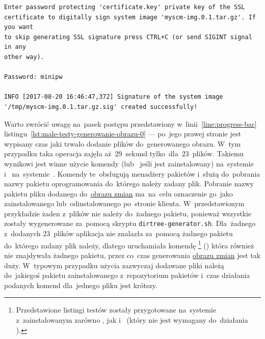 \documentclass[thesis]{subfiles}
\begin{document}
\begin{minipage}{\linewidth}
\begin{lstlisting}
Enter password protecting 'certificate.key' private key of the SSL
certificate to digitally sign system image 'myscm-img.0.1.tar.gz'. If you want
to skip generating SSL signature press CTRL+C (or send SIGINT signal in any
other way).

Password: minipw

INFO [2017-08-20 16:46:47,372] Signature of the system image '/tmp/myscm-img.0.1.tar.gz.sig' created successfully!
\end{lstlisting}
\end{minipage}

Warto zwrócić uwagę na~pasek postępu przedstawiony w~linii~\ref{line:progress-bar} listingu~\ref{lst:male-testy-generowanie-obrazu-0} --- po~jego prawej stronie jest wypisany czas jaki trwało dodanie plików do~generowanego obrazu. W~tym przypadku taka operacja zajęła aż~29~sekund tylko~dla~23~plików. Takiemu wynikowi jest winne użycie komendy  (lub~ jeśli jest zainstalowany) na~systemie \debian{} i~ na~systemie~\linuxarch{}. Komendy te~obsługują menadżery pakietów i~służą do~pobrania nazwy pakietu oprogramowania do~którego należy zadany plik. Pobranie nazwy pakietu pliku dodanego do~\hyperref[sec:obraz-zmian-konfiguracji]{obrazu zmian} ma~na~celu oznaczenie go~jako zainstalowanego lub~odinstalowanego po~stronie klienta. W~przedstawionym przykładzie żaden z~plików nie należy do~żadnego pakietu, ponieważ wszystkie zostały wygenerowane za~pomocą skryptu \texttt{dirtree-generator.sh}. Dla~żadnego z~dodanych 23~plików aplikacja nie znalazła za~pomocą  żadnego pakietu do~którego zadany plik należy, dlatego uruchamiała komendę \footnote{Przedstawione listingi testów zostały przygotowane na~systemie \debian{} z~zainstalowanym zarówno , jak i~ (który nie jest wymagany do~działania \texttt{\srvappname{}}).} () która również nie znajdywała żadnego pakietu, przez co~czas generowania \hyperref[sec:obraz-zmian-konfiguracji]{obrazu zmian} jest tak duży. W~typowym przypadku użycia \texttt{\srvappname{}} zazwyczaj dodawane pliki należą do~jakiegoś pakietu zainstalowanego z~repozytorium pakietów i~czas działania podanych komend dla~jednego pliku jest krótszy.
\end{document}
